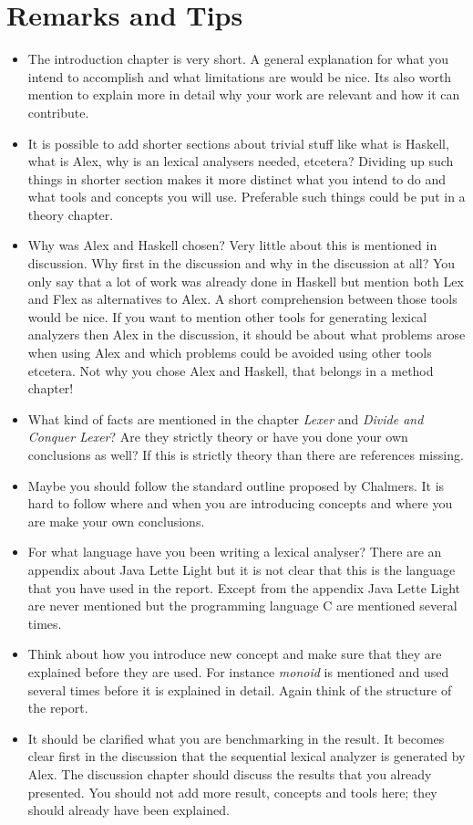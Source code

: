 \documentclass{article}
\begin{document}
\section*{Remarks and Tips}
\begin{itemize}
\item The introduction chapter is very short. A general explanation for what you
intend to accomplish and what limitations are would be nice. Its also worth
mention to explain more in detail why your work are relevant and how it can
contribute.

\item It is possible to add shorter sections about trivial stuff like what
is Haskell, what is Alex, why is an lexical analysers needed, etcetera? Dividing
up such things in shorter section makes it more distinct what you intend to do
and what tools and concepts you will use. Preferable such things could be put in
a theory chapter.

\item Why was Alex and Haskell chosen? Very little about this is mentioned in
discussion. Why first in the discussion and why in the discussion at all? You
only say that a lot of work was already done in Haskell but mention both Lex and
Flex as alternatives to Alex. A short comprehension between those tools would be
nice. If you want to mention other tools for generating lexical analyzers then
Alex in the discussion, it should be about what problems arose when using Alex
and which problems could be avoided using other tools etcetera.  Not why you
chose Alex and Haskell, that belongs in a method chapter!
\item What kind of facts are mentioned in the chapter \emph{Lexer} and
\emph{Divide and Conquer Lexer}? Are they strictly theory or have you done
your own conclusions as well? If this is strictly theory than there are
references missing.
\item Maybe you should follow the standard outline proposed by
Chalmers. It is hard to follow where and when you are introducing concepts and
where you are make your own conclusions.
\item For what language have you been writing a lexical analyser? There are an
appendix about Java Lette Light but it is not clear that this is the language
that you have used in the report. Except from the appendix Java Lette Light are
never mentioned but the programming language C are mentioned several times.
\item Think about how you introduce new concept and make sure that they are
explained before they are used. For instance
\emph{monoid} is mentioned and used several times before it is explained in
detail. Again think of the structure of the report.
\item It should be clarified what you are benchmarking in the result. It becomes
clear first in the discussion that the sequential lexical analyzer is generated by Alex.
The discussion chapter should discuss the results that you already presented.
You should not add more result, concepts and tools here; they should already
have been explained.
\end{itemize}
\end{document}
